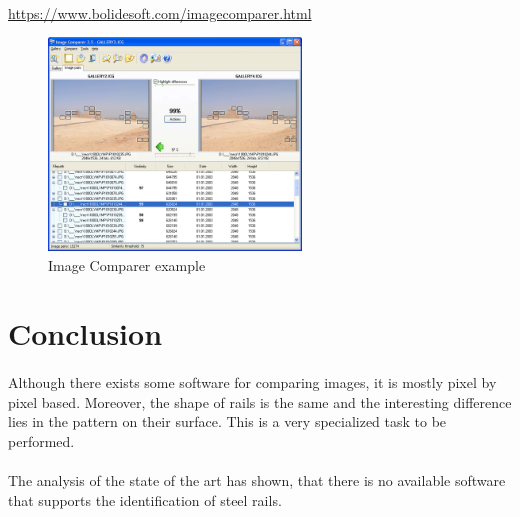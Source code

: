 \paragraph{}
\url{https://www.bolidesoft.com/imagecomparer.html}

\begin{figure}[h]
	\centering
	\includegraphics[width=0.6\textwidth]{images/image_comparer}
	\caption{Image Comparer example}
	\label{fig:image_comparator}
\end{figure}


\section{Conclusion}
\paragraph{}
Although there exists some software for comparing images, it is mostly pixel by pixel based. Moreover, the shape of rails is the same and the interesting difference lies in the pattern on their surface. This is a very specialized task to be performed.

\paragraph{}
The analysis of the state of the art has shown, that there is no available software that supports the identification of steel rails.